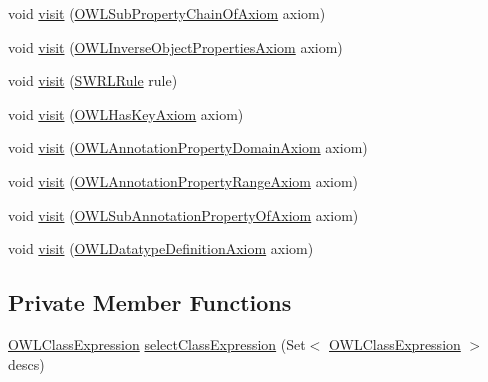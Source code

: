 \begin{DoxyCompactItemize}
void \hyperlink{classorg_1_1semanticweb_1_1owlapi_1_1util_1_1_axiom_subject_provider_a1f9dba3c053709364f9abfc11afeb543}{visit} (\hyperlink{interfaceorg_1_1semanticweb_1_1owlapi_1_1model_1_1_o_w_l_sub_property_chain_of_axiom}{O\-W\-L\-Sub\-Property\-Chain\-Of\-Axiom} axiom)
\item 
void \hyperlink{classorg_1_1semanticweb_1_1owlapi_1_1util_1_1_axiom_subject_provider_ae06280aa18a5ea825e6fdc69c56257b9}{visit} (\hyperlink{interfaceorg_1_1semanticweb_1_1owlapi_1_1model_1_1_o_w_l_inverse_object_properties_axiom}{O\-W\-L\-Inverse\-Object\-Properties\-Axiom} axiom)
\item 
void \hyperlink{classorg_1_1semanticweb_1_1owlapi_1_1util_1_1_axiom_subject_provider_ad9e13eac0428964cd2d5eb4f854c71db}{visit} (\hyperlink{interfaceorg_1_1semanticweb_1_1owlapi_1_1model_1_1_s_w_r_l_rule}{S\-W\-R\-L\-Rule} rule)
\item 
void \hyperlink{classorg_1_1semanticweb_1_1owlapi_1_1util_1_1_axiom_subject_provider_a99f79f45b4fb9c4131a94f74a02e1aa5}{visit} (\hyperlink{interfaceorg_1_1semanticweb_1_1owlapi_1_1model_1_1_o_w_l_has_key_axiom}{O\-W\-L\-Has\-Key\-Axiom} axiom)
\item 
void \hyperlink{classorg_1_1semanticweb_1_1owlapi_1_1util_1_1_axiom_subject_provider_a53f7a1c42fb080ab37e89a167fcd2c08}{visit} (\hyperlink{interfaceorg_1_1semanticweb_1_1owlapi_1_1model_1_1_o_w_l_annotation_property_domain_axiom}{O\-W\-L\-Annotation\-Property\-Domain\-Axiom} axiom)
\item 
void \hyperlink{classorg_1_1semanticweb_1_1owlapi_1_1util_1_1_axiom_subject_provider_a48267d6ca771ea4bea949323d338cece}{visit} (\hyperlink{interfaceorg_1_1semanticweb_1_1owlapi_1_1model_1_1_o_w_l_annotation_property_range_axiom}{O\-W\-L\-Annotation\-Property\-Range\-Axiom} axiom)
\item 
void \hyperlink{classorg_1_1semanticweb_1_1owlapi_1_1util_1_1_axiom_subject_provider_a149845ec7852ac5abc29a43a4e6a0966}{visit} (\hyperlink{interfaceorg_1_1semanticweb_1_1owlapi_1_1model_1_1_o_w_l_sub_annotation_property_of_axiom}{O\-W\-L\-Sub\-Annotation\-Property\-Of\-Axiom} axiom)
\item 
void \hyperlink{classorg_1_1semanticweb_1_1owlapi_1_1util_1_1_axiom_subject_provider_a51ad35ac5374f462e2d3dde90992b36b}{visit} (\hyperlink{interfaceorg_1_1semanticweb_1_1owlapi_1_1model_1_1_o_w_l_datatype_definition_axiom}{O\-W\-L\-Datatype\-Definition\-Axiom} axiom)
\end{DoxyCompactItemize}
\subsection*{Private Member Functions}
\begin{DoxyCompactItemize}
\item 
\hyperlink{interfaceorg_1_1semanticweb_1_1owlapi_1_1model_1_1_o_w_l_class_expression}{O\-W\-L\-Class\-Expression} \hyperlink{classorg_1_1semanticweb_1_1owlapi_1_1util_1_1_axiom_subject_provider_a800904a8aa6fbe5e48baad120385bdac}{select\-Class\-Expression} (Set$<$ \hyperlink{interfaceorg_1_1semanticweb_1_1owlapi_1_1model_1_1_o_w_l_class_expression}{O\-W\-L\-Class\-Expression} $>$ descs)
\end{DoxyCompactItemize}

